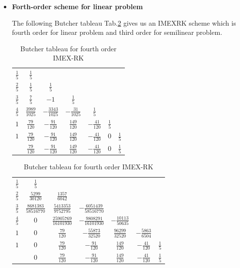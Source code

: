 \documentclass[a4paper, oneside]{book}
\begin{document}
\begin{itemize}
This scheme agrees with Remark \ref{Remark:IMEX-Energy}. 
In this example,
$$\sigma(\lambda) = \frac{1228800+ 33778560\lambda + 55256268 \lambda^2 + 5250325\lambda^3 }
{1228800+ 35007360\lambda + 89649228 \lambda^2 + 77600673\lambda^3 +21689019\lambda^4}, \forall \lambda > 0$$

\item[(v)] {\bf Forth-order scheme for linear problem}

 The following Butcher tableau Tab.\ref{Tab:four_linear} gives us an IMEXRK scheme 
 which is fourth order for linear problem and third order for semilinear problem.
 \linespread{1.5}
 \begin{table}[h]
     \centering
     \begin{tabular}[h]{c|cccccc}
         $\frac{1}{5}$ & $\frac{1}{5}$ \\
         $\frac{2}{5}$ & $\frac{1}{5}$&$\frac{1}{5}$\\
         $\frac{3}{5}$ & $\frac{7}{5}$&$-1$&$\frac{1}{5}$\\
         $\frac{4}{5}$ & $\frac{3989}{1025}$&$-\frac{3343}{1025}$&$-\frac{31}{1025}$&$\frac{1}{5}$\\
         $1$ & $\frac{79}{120}$&$-\frac{91}{120}$&$\frac{149}{120}$&$-\frac{41}{120}$&$\frac{1}{5}$\\
         $1$ & $\frac{79}{120}$&$-\frac{91}{120}$&$\frac{149}{120}$&$-\frac{41}{120}$&$0$ &$\frac{1}{5}$\\
         \hline
         ~ & $\frac{79}{120}$&$-\frac{91}{120}$&$\frac{149}{120}$&$-\frac{41}{120}$&$0$ &$\frac{1}{5}$\\
     \end{tabular}
     \begin{tabular}[h]{c|cccccc}
         $\frac{1}{5}$ & $\frac{1}{5}$ \\
         $\frac{2}{5}$ & $\frac{5299}{30120}$&$\frac{1357}{6042}$\\
         $\frac{3}{5}$ & $\frac{8681383}{58516770}$&$\frac{5413353}{9752795}$&$-\frac{6051439}{58516770}$\\
         $\frac{4}{5}$ & $0$&$\frac{25905769}{16101930}$&$-\frac{9808291}{16101930}$&$-\frac{10113}{50635}$\\
         $1$&$0$ & $\frac{79}{120}$&$-\frac{55873}{32520}$&$\frac{96299}{32520}$&$-\frac{5863}{6504}$\\
         $1$ &$0$ &$\frac{79}{120}$&$-\frac{91}{120}$&$\frac{149}{120}$&$-\frac{41}{120}$ &$\frac{1}{5}$\\
         \hline
         ~ &$0$ &$\frac{79}{120}$&$-\frac{91}{120}$&$\frac{149}{120}$&$-\frac{41}{120}$ &$\frac{1}{5}$\\
     \end{tabular}
     \caption{{Butcher tableau for fourth order IMEX-RK}}\label{Tab:four_linear}
 \end{table}


\end{itemize}
\end{document}
